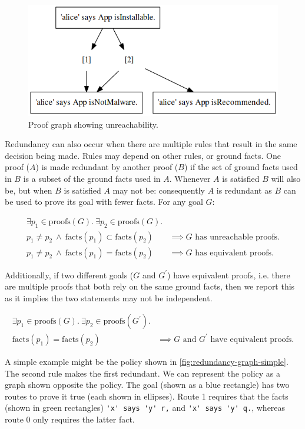 \documentclass[thesis.tex]{subfiles}
\begin{document}
\begin{figure}
  \centering
  \includegraphics[width=0.5\linewidth]{./figures/unreachability.png}
  \caption{Proof graph showing unreachability.}
  \label{fig:unreachability}
\end{figure}

Redundancy can also occur when there are multiple rules that result in the
same decision being made.  Rules may depend on other rules, or ground
facts.  One proof ($A$) is made redundant by another proof ($B$) if
the set of ground facts used in $B$ is a subset of the ground facts
used in $A$. Whenever $A$ is satisfied $B$ will also be, but when $B$
is satisfied $A$ may not be: consequently $A$ is redundant as $B$ can
be used to prove its goal with fewer facts.  For any goal
$G$:

\begin{align*}
  \exists p_1 \in \text{proofs}(G).~\exists p_2 \in \text{proofs}(G).        & \\
  p_1 \not= p_2~\wedge~\text{facts}(p_1) \subset \text{facts}(p_2)           & \implies G\text{ has unreachable proofs.} \\
  p_1 \not= p_2~\wedge~\text{facts}(p_1) = \text{facts}(p_2)                 & \implies G\text{ has equivalent proofs.}
\end{align*}

Additionally, if two different goals ($G$ and $G^\prime$) have
equivalent proofs, i.e. there are multiple proofs that both rely on the same ground facts, then we report this as it implies the two
statements may not be independent.

\begin{align*}
  \exists p_1 \in \text{proofs}(G).~\exists p_2 \in \text{proofs}(G^\prime). & \\
  \text{facts}(p_1) = \text{facts}(p_2)                                      & \implies \text{$G$ and $G^\prime$ have equivalent proofs.}
\end{align*}

A simple example might be the policy shown in \autoref{fig:redundancy-graph-simple}.
The second rule makes the first redundant.  We can represent the policy
as a graph shown opposite the policy.  The goal (shown as a blue rectangle) has two routes
to prove it true (each shown in ellipses).  Route 1 requires that the facts
(shown in green rectangles) \lstinline!'x' says 'y' r,! and
\lstinline!'x' says 'y' q.!, whereas route 0 only requires the
latter fact.
\end{document}
